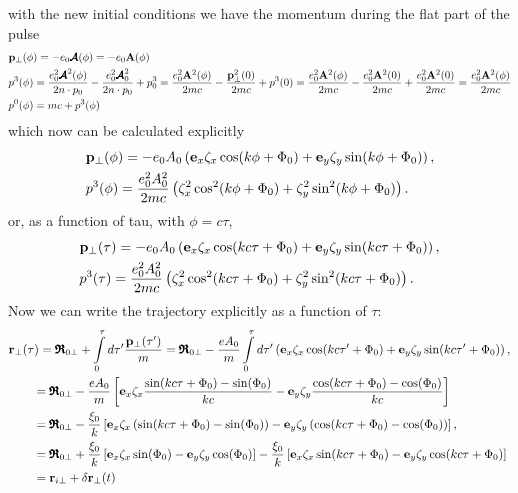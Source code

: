 with the new initial conditions we have the momentum during the flat part of the pulse
\begin{align}
     & {\bf p}_\perp(\phi) = -e_0{\pmb{\cal A}}(\phi) = -e_0{\bf A}(\phi)                                                                                                                                                                                                                                                          \\
     & p^3(\phi) =\frac{e_0^2{\pmb{\cal A}}^2(\phi)}{2n\cdot p_0}-\frac{e_0^2{\pmb{\cal A}}^2_0}{2n\cdot p_0}+p_{0}^3 = \frac{e_0^2{\bf A}^2(\phi)}{2mc}-\frac{{\bf p}_{\perp}^2(0)}{2mc}+p^3(0) = \frac{e_0^2{\bf A}^2(\phi)}{2mc}-\frac{e_0^2{\bf A}^2(0)}{2mc}+\frac{e_0^2{\bf A}^2(0)}{2mc} = \frac{e_0^2{\bf A}^2(\phi)}{2mc} \\
     & p^0(\phi) = mc + p^3(\phi)
\end{align}
which now can be calculated explicitly
\begin{align}
     & {\bf p}_\perp(\phi) = -e_0 A_0  \left( {\bf e}_x \zeta_x \cos(k \phi + \Phi_0) + {\bf e}_y \zeta_y \sin(k \phi + \Phi_0) \right), \\
     & p^3(\phi) =\frac{e_0^2 A_0^2 }{2mc} \left( \zeta_x^2\cos^2(k \phi + \Phi_0) + \zeta_y^2\sin^2(k \phi + \Phi_0) \right).
\end{align}
or, as a function of tau, with \(\phi = c\tau\),
\begin{align}
     & {\bf p}_\perp(\tau) = -e_0 A_0  \left( {\bf e}_x \zeta_x \cos(k c\tau + \Phi_0) + {\bf e}_y \zeta_y \sin(k c\tau + \Phi_0) \right), \\
     & p^3(\tau) =\frac{e_0^2 A_0^2 }{2mc} \left( \zeta_x^2\cos^2(k c\tau + \Phi_0) + \zeta_y^2\sin^2(k c\tau + \Phi_0) \right).
\end{align}
Now we can write the trajectory explicitly as a function of \(\tau\):
\begin{align}
     & {\bf r}_{\perp}(\tau) = {\pmb{\mathfrak R}}_{0\perp}+\int\limits_0^{\tau} d\tau' \frac{{\bf p}_\perp(\tau')}{m} = {\pmb{\mathfrak R}}_{0\perp} - \frac{eA_0}{m}\int\limits_0^\tau d\tau' \left( {\bf e}_x \zeta_x \cos(k c\tau' + \Phi_0) + {\bf e}_y \zeta_y \sin(k c\tau' + \Phi_0) \right),           \\
     & \qquad = {\pmb{\mathfrak R}}_{0\perp} - \frac{eA_0}{m}\left[ {\bf e}_x \zeta_x \frac{\sin(k c\tau + \Phi_0) - \sin(\Phi_0)}{kc} - {\bf e}_y \zeta_y \frac{\cos(k c\tau + \Phi_0) - \cos(\Phi_0)}{kc} \right]                                                                                   \nonumber \\
     & \qquad = {\pmb{\mathfrak R}}_{0\perp} - \frac{\xi_0}{k}\left[ {\bf e}_x \zeta_x \left(\sin(k c\tau + \Phi_0) - \sin(\Phi_0)\right) - {\bf e}_y \zeta_y \left(\cos(k c\tau +      \Phi_0) - \cos(\Phi_0)\right) \right],\nonumber
    \\&\qquad ={\pmb{\mathfrak R}}_{0\perp} + \frac{\xi_0}{k}\left[ {\bf e}_x \zeta_x \sin(\Phi_0) - {\bf e}_y \zeta_y \cos(\Phi_0) \right]-\frac{\xi_0}{k}\left[{\bf e}_x \zeta_x \sin(k c\tau + \Phi_0) - {\bf e}_y \zeta_y \cos(k c\tau + \Phi_0)\right]
    \\&\qquad = {\bf r}_{i\perp} + \delta {\mathbf r}_\perp(t)
\end{align}
